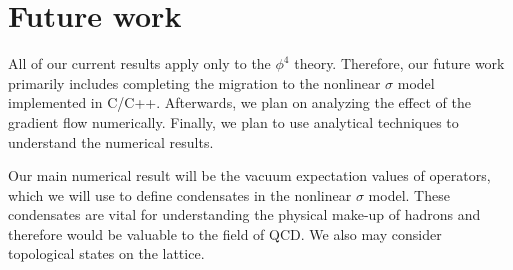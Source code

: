 \documentclass[12pt]{article}
\begin{document}
\section{Future work}
All of our current results apply only to the $\phi^4$ theory. Therefore, our future work primarily includes completing the migration to the nonlinear $\sigma$ model implemented in C/C++. Afterwards, we plan on analyzing the effect of the gradient flow numerically. Finally, we plan to use analytical techniques to understand the numerical results.

Our main numerical result will be the vacuum expectation values of operators, which we will use to define condensates in the nonlinear $\sigma$ model. These condensates are vital for understanding the physical make-up of hadrons and therefore would be valuable to the field of QCD. We also may consider topological states on the lattice.

\begin{flushleft}









\end{flushleft}
\end{document}
